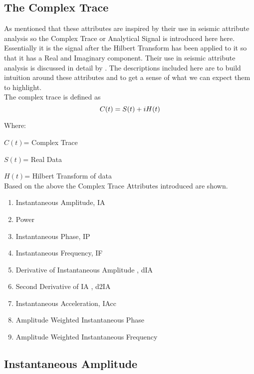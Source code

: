 \subsection{The Complex Trace}

As mentioned that these attributes are inspired by their use in seismic attribute analysis so the Complex Trace or Analytical Signal is introduced here here. Essentially it is the signal after the Hilbert Transform has been applied to it so that it has a Real and Imaginary component. Their use in seismic attribute analysis is discussed in detail by \citeauthor{Li2014,Subrahmanyam}\cite{Li2014,Subrahmanyam}. The descriptions included here are to build intuition around these attributes and to get a sense of what we can expect them to highlight. \\

The complex trace is defined as 
\begin{equation}
    C(t) = S(t) + iH(t) \\
\end{equation}

Where:

$C(t)$= Complex Trace

$S(t)$= Real Data

$H(t)$= Hilbert Transform of data \\

Based on the above the Complex Trace Attributes introduced are shown.

\begin{enumerate}
    \item Instantaneous Amplitude, IA  
    \item Power
    \item Instantaneous Phase, IP   
    \item Instantaneous Frequency, IF 
    \item Derivative of Instantaneous Amplitude  , dIA
    \item Second Derivative of IA  , d2IA
    \item Instantaneous Acceleration, IAcc 
    \item Amplitude Weighted Instantaneous Phase 
    \item Amplitude Weighted Instantaneous Frequency 
 \end{enumerate}
    
\subsection{Instantaneous Amplitude}

